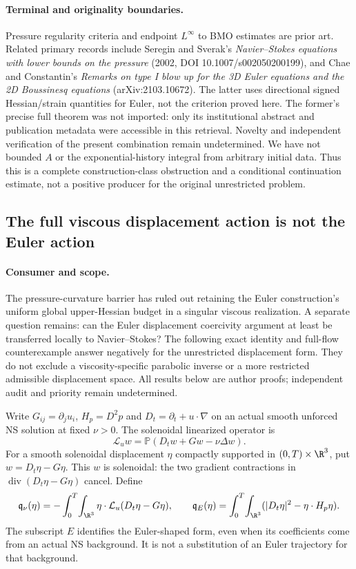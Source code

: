 \paragraph{Terminal and originality boundaries.}
Pressure regularity criteria and endpoint $L^\infty$ to BMO estimates are
prior art. Related primary records include Seregin and Sverak's
\emph{Navier--Stokes equations with lower bounds on the pressure}
(2002, DOI 10.1007/s002050200199), and Chae and Constantin's
\emph{Remarks on type I blow up for the 3D Euler equations and the 2D
Boussinesq equations} (arXiv:2103.10672). The latter uses directional
signed Hessian/strain quantities for Euler, not the criterion proved
here. The former's precise full theorem was not imported: only its
institutional abstract and publication metadata were accessible in this
retrieval. Novelty and independent verification of the present combination
remain undetermined. We have not bounded $A$ or the exponential-history
integral from arbitrary initial data. Thus this is a complete
construction-class obstruction and a conditional continuation estimate,
not a positive producer for the original unrestricted problem.

\subsection{The full viscous displacement action is not the Euler action}
\label{va:section}

\paragraph{Consumer and scope.}
The pressure-curvature barrier has ruled out retaining the Euler construction's
uniform global upper-Hessian budget in a singular viscous realization.
A separate question remains: can the Euler displacement coercivity argument
at least be transferred locally to Navier--Stokes? The following exact identity
and full-flow counterexample answer negatively for the unrestricted displacement
form. They do not exclude a viscosity-specific parabolic inverse or a more
restricted admissible displacement space. All results below are author proofs;
independent audit and priority remain undetermined.

Write $G_{ij}=\partial_j u_i$, $H_p=D^2p$ and $D_t=\partial_t+u\cdot\nabla$
on an actual smooth unforced NS solution at fixed $\nu>0$. The solenoidal
linearized operator is
\[
 \mathcal L_u w=\mathbb P(D_t w+Gw-\nu\Delta w).
\]
For a smooth solenoidal displacement $\eta$ compactly supported in
$(0,T)\times\R^3$, put $w=D_t\eta-G\eta$. This $w$ is solenoidal:
the two gradient contractions in $\operatorname{div}(D_t\eta-G\eta)$ cancel.
Define
\[
 \mathfrak q_\nu(\eta)=-\int_0^T\!\int_{\R^3}
       \eta\cdot\mathcal L_u(D_t\eta-G\eta),\qquad
 \mathfrak q_E(\eta)=\int_0^T\!\int_{\R^3}
       (|D_t\eta|^2-\eta\cdot H_p\eta).
\]
The subscript $E$ identifies the Euler-shaped form, even when its coefficients
come from an actual NS background. It is not a substitution of an Euler
trajectory for that background.

